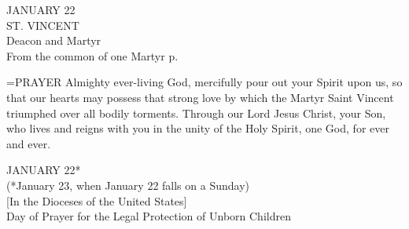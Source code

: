 \begin{center}\normalsize JANUARY 22\\
\footnotesize ST. VINCENT\\
\footnotesize Deacon and Martyr\\
\footnotesize From the common of one Martyr p. \\
\end{center}

\hangindent=\parindent \small{PRAYER 
Almighty ever-living God,
mercifully pour out your Spirit upon us,
so that our hearts may possess that strong love
by which the Martyr Saint Vincent
triumphed over all bodily torments.
Through our Lord Jesus Christ, your Son,
who lives and reigns with you in the unity of the Holy Spirit,
one God, for ever and ever.\\}
 
\begin{center}\normalsize JANUARY 22*\\
\footnotesize (*January 23, when January 22 falls on a Sunday)\\
\footnotesize [In the Dioceses of the United States]\\
\footnotesize Day of Prayer for the Legal Protection of Unborn Children\\
\end{center}

